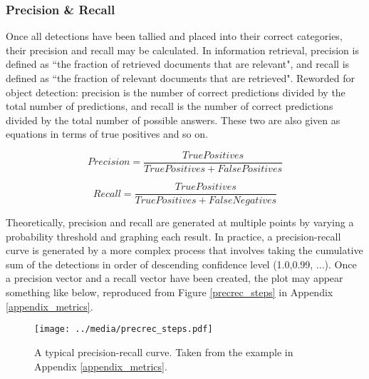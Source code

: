 \subsubsection{Precision \& Recall}
\label{subsect_precrec}
Once all detections have been tallied and placed into their correct categories, their precision and recall may be calculated. In information retrieval, precision is defined as ``the fraction of retrieved documents that are relevant", and recall is defined as ``the fraction of relevant documents that are retrieved". Reworded for object detection: precision is the number of correct predictions divided by the total number of predictions, and recall is the number of correct predictions divided by the total number of possible answers. These two are also given as equations in terms of true positives and so on.

\begin{equation}
Precision = \frac{TruePositives}{TruePositives + FalsePositives}
\label{eq_prec}
\end{equation}

\begin{equation}
Recall = \frac{TruePositives}{TruePositives + FalseNegatives}
\label{eq_rec}
\end{equation}

Theoretically, precision and recall are generated at multiple points by varying a probability threshold and graphing each result. In practice, a precision-recall curve is generated by a more complex process that involves taking the cumulative sum of the detections in order of descending confidence level (1.0,0.99, ...). Once a precision vector and a recall vector have been created, the plot may appear something like below, reproduced from Figure \ref{precrec_steps} in Appendix \ref{appendix_metrics}. 

\begin{figure}[H]
	\centering
	\texttt{[image: ../media/precrec\_steps.pdf]}
	\caption{A typical precision-recall curve. Taken from the example in Appendix \ref{appendix_metrics}.}
\end{figure}


